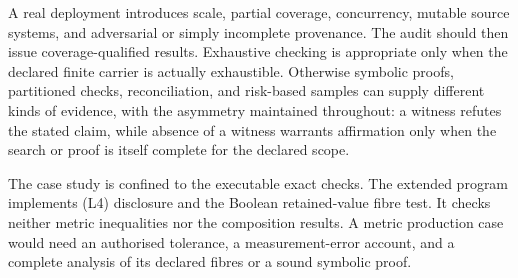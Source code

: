 \documentclass[11pt]{article}
\theoremstyle{definition}
\begin{document}
A real deployment introduces scale, partial coverage, concurrency, mutable source systems, and adversarial or simply incomplete provenance. The audit should then issue coverage-qualified results. Exhaustive checking is appropriate only when the declared finite carrier is actually exhaustible. Otherwise symbolic proofs, partitioned checks, reconciliation, and risk-based samples can supply different kinds of evidence, with the asymmetry maintained throughout: a witness refutes the stated claim, while absence of a witness warrants affirmation only when the search or proof is itself complete for the declared scope.

The case study is confined to the executable exact checks. The extended program implements (L4) disclosure and the Boolean retained-value fibre test. It checks neither metric inequalities nor the composition results. A metric production case would need an authorised tolerance, a measurement-error account, and a complete analysis of its declared fibres or a sound symbolic proof.
\end{document}
